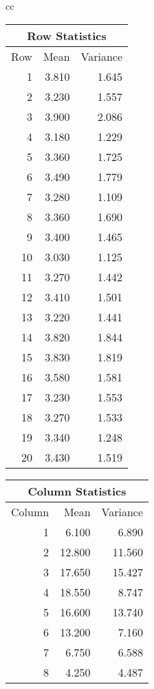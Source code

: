 \begin{tabular}{cc} %
\begin{tabular}{|r|r|r|} %
\hline\multicolumn{3}{|c|}{Row Statistics}\\ \hline\hline Row & Mean & Variance \\
\hline\hline
1 &  3.810 &  1.645 \\
\hline
2 &  3.230 &  1.557 \\
\hline
3 &  3.900 &  2.086 \\
\hline
4 &  3.180 &  1.229 \\
\hline
5 &  3.360 &  1.725 \\
\hline
6 &  3.490 &  1.779 \\
\hline
7 &  3.280 &  1.109 \\
\hline
8 &  3.360 &  1.690 \\
\hline
9 &  3.400 &  1.465 \\
\hline
10 &  3.030 &  1.125 \\
\hline
11 &  3.270 &  1.442 \\
\hline
12 &  3.410 &  1.501 \\
\hline
13 &  3.220 &  1.441 \\
\hline
14 &  3.820 &  1.844 \\
\hline
15 &  3.830 &  1.819 \\
\hline
16 &  3.580 &  1.581 \\
\hline
17 &  3.230 &  1.553 \\
\hline
18 &  3.270 &  1.533 \\
\hline
19 &  3.340 &  1.248 \\
\hline
20 &  3.430 &  1.519 \\
\hline
\end{tabular} \begin{tabular}{|r|r|r|} \hline\multicolumn{3}{|c|}{Column Statistics}\\ \hline\hline Column & Mean & Variance \\
\hline\hline
1 &  6.100 &  6.890 \\
\hline
2 & 12.800 & 11.560 \\
\hline
3 & 17.650 & 15.427 \\
\hline
4 & 18.550 &  8.747 \\
\hline
5 & 16.600 & 13.740 \\
\hline
6 & 13.200 &  7.160 \\
\hline
7 &  6.750 &  6.588 \\
\hline
8 &  4.250 &  4.487 \\

\end{tabular}
\end{tabular}

